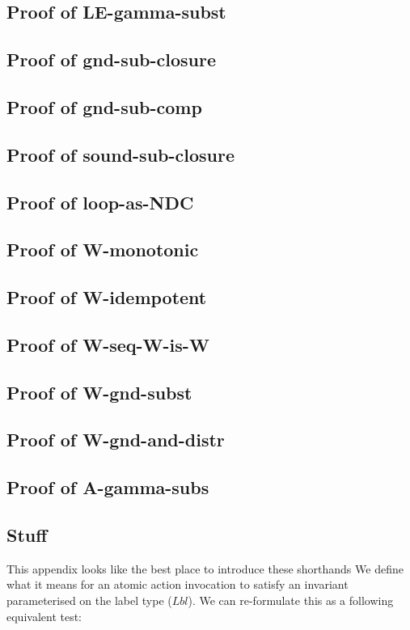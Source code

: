\subsection{Proof of LE-gamma-subst}
\subsection{Proof of gnd-sub-closure}
\subsection{Proof of gnd-sub-comp}
\subsection{Proof of sound-sub-closure}
\subsection{Proof of loop-as-NDC}
\subsection{Proof of W-monotonic}
\subsection{Proof of W-idempotent}
\subsection{Proof of W-seq-W-is-W}
\subsection{Proof of W-gnd-subst}
\subsection{Proof of W-gnd-and-distr}
\subsection{Proof of A-gamma-subs}


\subsection{Stuff}
This appendix looks like the best place to introduce these shorthands
We define what it means for an atomic action invocation
to satisfy an invariant parameterised on the label type ($Lbl$).
We can re-formulate this as a following equivalent test:


